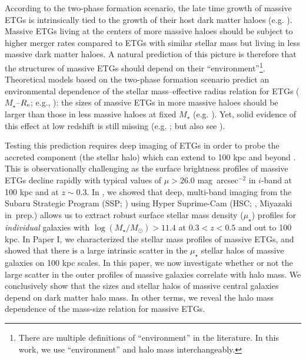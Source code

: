 \documentclass[a4paper,fleqn,usenatbib]{mnras}
\def\sb{mag~arcsec$^{-2}$}
\def\mstar{{$M_{\star}$}}
\def\logms{{$\log (M_{\star}/M_{\odot})$}}
\def\mden{{$\mu_{\star}$}}
\begin{document}
    According to the two-phase formation scenario, the late time growth of massive 
    ETGs is intrinsically tied to the growth of their host dark matter haloes 
    (e.g. \citealt{Leauthaud2012, Behroozi2013, Shankar2013}). 
    Massive ETGs living at the centers of more massive haloes should be subject to 
    higher merger rates compared to ETGs with similar stellar mass but living in less 
    massive dark matter haloes. 
    A natural prediction of this picture is therefore that the structures of 
    massive ETGs should depend on their ``environment''\footnote{There are 
    multiple definitions of ``environment'' in the literature.  
    In this work, we use ``environment'' and halo mass interchangeably.}.
    Theoretical models based on the two-phase formation scenario predict an 
    environmental dependence of the stellar mass--effective radius relation for 
    ETGs (\mstar{}--$R_{\rm e}$; 
    e.g., \citealt{Shen2003, Guo2009}): the sizes of massive ETGs in more massive 
    haloes should be larger than those in less massive haloes at fixed \mstar{} 
    (e.g. \citealt{Shankar2013, Shankar2014}). 
    Yet, solid evidence of this effect at low redshift is still missing 
    (e.g. \citealt{Nair2010, HCompany13}; but also see \citealt{Yoon2017}).
    
    
	
    Testing this prediction requires deep imaging of ETGs in order to probe the 
    accreted component (the stellar halo) which can extend to 100 kpc and 
    beyond \citep[eg.,][]{hscMassiveI}. 
    This is observationally challenging as the surface brightness profiles of massive 
    ETGs decline rapidly with typical values of $\mu > 26.0$ \sb{} in $i$-band at 100 
    kpc and at $z\sim0.3$. 
    In \citet[][Paper I hereafter]{hscMassiveI}, we showed that deep, 
    multi-band imaging from the Subaru Strategic Program (SSP; \citealt{HSC-SSP,
    HSC-DR1}) using Hyper Suprime-Cam (HSC; \citealt{Miyazaki2012}, 
    Miyazaki in~prep.) allows us to extract robust surface stellar
    mass density (\mden{}) profiles for {\it individual} galaxies with 
    \logms{}$>11.4$ at $0.3 < z < 0.5$ and out to 100 kpc. 
    In Paper I, we characterized the stellar mass profiles of massive ETGs, and 
    showed that there is a large intrinsic scatter in the \mden{} stellar halos of
    massive galaxies on 100 kpc scales. 
    In this paper, we now investigate whether or not the large scatter in the outer 
    profiles of massive galaxies correlate with halo mass. 
    We conclusively show that the sizes and stellar halos of massive central galaxies 
    depend on dark matter halo mass. 
    In other terms, we reveal the halo mass dependence of the mass-size relation 
    for massive ETGs.   
    
\end{document}
